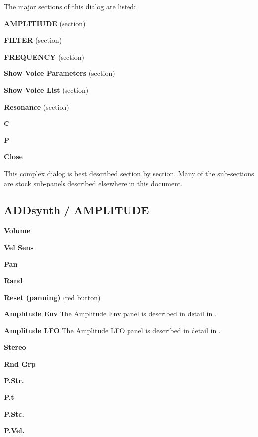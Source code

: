    The major sections of this dialog are listed:

   \begin{enumber}
      \item \textbf{AMPLITIUDE} (section)
      \item \textbf{FILTER} (section)
      \item \textbf{FREQUENCY} (section)
      \item \textbf{Show Voice Parameters} (section)
      \item \textbf{Show Voice List} (section)
      \item \textbf{Resonance} (section)
      \item \textbf{C}
      \item \textbf{P}
      \item \textbf{Close}
   \end{enumber}

   This complex dialog is best described section by section.
   Many of the sub-sections are stock sub-panels described elsewhere
   in this document.

\subsection{ADDsynth / AMPLITUDE}
\label{subsec:addsynth_amplitude}

   \begin{enumber}
      \item \textbf{Volume}
      \item \textbf{Vel Sens}
      \item \textbf{Pan}
      \item \textbf{Rand}
      \item \textbf{Reset (panning)} (red button)
      \item \textbf{Amplitude Env}
         The Amplitude Env panel is described in detail in
         .
      \item \textbf{Amplitude LFO}
         The Amplitude LFO panel is described in detail in
         .
      \item \textbf{Stereo}
      \item \textbf{Rnd Grp}
      \item \textbf{P.Str.}
      \item \textbf{P.t}
      \item \textbf{P.Stc.}
      \item \textbf{P.Vel.}
   \end{enumber}

